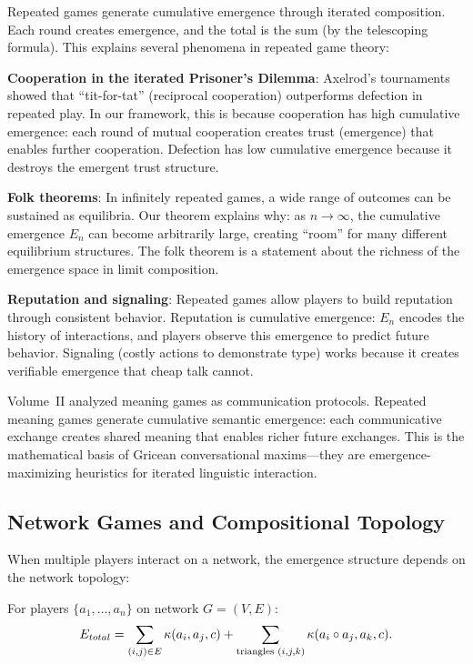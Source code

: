 \begin{interpretation}
Repeated games generate cumulative emergence through iterated composition. Each
round creates emergence, and the total is the sum (by the telescoping formula).
This explains several phenomena in repeated game theory:

\textbf{Cooperation in the iterated Prisoner's Dilemma}: Axelrod's tournaments
showed that ``tit-for-tat'' (reciprocal cooperation) outperforms defection in
repeated play. In our framework, this is because cooperation has high cumulative
emergence: each round of mutual cooperation creates trust (emergence) that
enables further cooperation. Defection has low cumulative emergence because it
destroys the emergent trust structure.

\textbf{Folk theorems}: In infinitely repeated games, a wide range of outcomes
can be sustained as equilibria. Our theorem explains why: as $n \to \infty$,
the cumulative emergence $E_n$ can become arbitrarily large, creating ``room''
for many different equilibrium structures. The folk theorem is a statement about
the richness of the emergence space in limit composition.

\textbf{Reputation and signaling}: Repeated games allow players to build
reputation through consistent behavior. Reputation is cumulative emergence:
$E_n$ encodes the history of interactions, and players observe this emergence
to predict future behavior. Signaling (costly actions to demonstrate type) works
because it creates verifiable emergence that cheap talk cannot.

Volume~II analyzed meaning games as communication protocols. Repeated meaning
games generate cumulative semantic emergence: each communicative exchange creates
shared meaning that enables richer future exchanges. This is the mathematical
basis of Gricean conversational maxims---they are emergence-maximizing heuristics
for iterated linguistic interaction.
\end{interpretation}

\subsection{Network Games and Compositional Topology}

When multiple players interact on a network, the emergence structure depends on
the network topology:

\begin{theorem}
\label{thm:network-emergence}
For players $\{a_1, \ldots, a_n\}$ on network $G = (V, E)$:
\[
  E_{total} = \sum_{(i,j) \in E} \kappa(a_i, a_j, c)
  + \sum_{\text{triangles } (i,j,k)} \kappa(a_i \circ a_j, a_k, c).
\]
\end{theorem}

